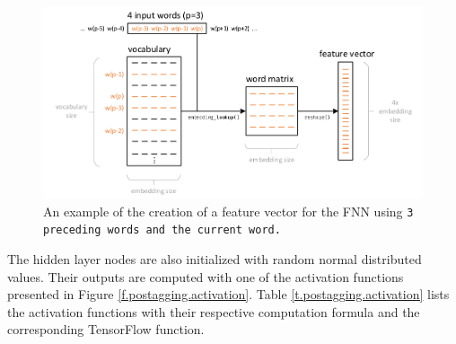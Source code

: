 \begin{figure}[ht]
	\vspace{1.5em}
	\hspace{-1.5em}\includegraphics[width=1.1\textwidth]{images/feature_vector}
	\caption[Creation of the feature vector]{An example of the creation of a feature vector for the FNN using \tt{3} preceding words and the current word.}
	\label{f.fnn.feature}
	\vspace{.5em}
\end{figure}

The hidden layer nodes are also initialized with random normal distributed values. Their outputs are computed with one of the activation functions presented in Figure \ref{f.postagging.activation}. Table \ref{t.postagging.activation} lists the activation functions with their respective computation formula and the corresponding TensorFlow function.

